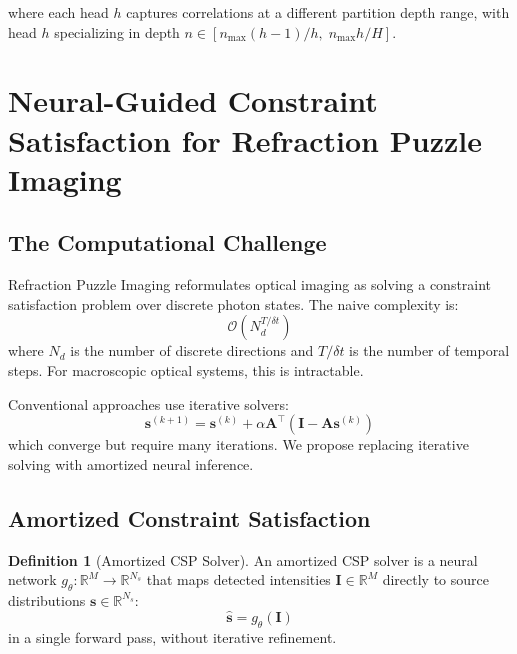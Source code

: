\documentclass[11pt,twocolumn,a4paper]{article}
\theoremstyle{definition}
\newtheorem{definition}[theorem]{Definition}
\theoremstyle{remark}
\newcommand{\R}{\mathbb{R}}
\newcommand{\params}{\theta}
\begin{document}
where each head $h$ captures correlations at a different partition depth range, with head $h$ specializing in depth $n \in [n_{\max}(h-1)/h, \; n_{\max} h/H]$.

\section{Neural-Guided Constraint Satisfaction for Refraction Puzzle Imaging}
\label{sec:csp}

\subsection{The Computational Challenge}

Refraction Puzzle Imaging reformulates optical imaging as solving a constraint satisfaction problem over discrete photon states. The naive complexity is:
\begin{equation}
\mathcal{O}(N_d^{T/\delta t})
\end{equation}
where $N_d$ is the number of discrete directions and $T/\delta t$ is the number of temporal steps. For macroscopic optical systems, this is intractable.

Conventional approaches use iterative solvers:
\begin{equation}
\mathbf{s}^{(k+1)} = \mathbf{s}^{(k)} + \alpha \mathbf{A}^\top(\mathbf{I} - \mathbf{A}\mathbf{s}^{(k)})
\end{equation}
which converge but require many iterations. We propose replacing iterative solving with amortized neural inference.

\subsection{Amortized Constraint Satisfaction}

\begin{definition}[Amortized CSP Solver]
\label{def:amortized}
An amortized CSP solver is a neural network $g_\params: \R^M \to \R^{N_s}$ that maps detected intensities $\mathbf{I} \in \R^M$ directly to source distributions $\mathbf{s} \in \R^{N_s}$:
\begin{equation}
\hat{\mathbf{s}} = g_\params(\mathbf{I})
\end{equation}
in a single forward pass, without iterative refinement.
\end{definition}
\end{document}
